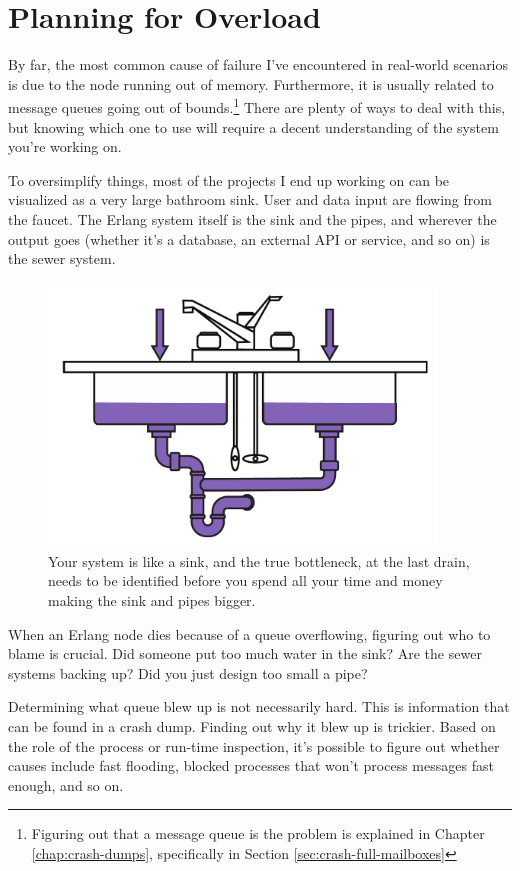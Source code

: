 \documentclass[11pt, oneside]{book}   	%
\begin{document}


\chapter{Planning for Overload}
\label{chap:overload}

By far, the most common cause of failure I've encountered in real-world scenarios is due to the node running out of memory. Furthermore, it is usually related to message queues going out of bounds.\footnote{Figuring out that a message queue is the problem is explained in Chapter \ref{chap:crash-dumps}, specifically in Section \ref{sec:crash-full-mailboxes}} There are plenty of ways to deal with this, but knowing which one to use will require a decent understanding of the system you're working on.

To oversimplify things, most of the projects I end up working on can be visualized as a very large bathroom sink. User and data input are flowing from the faucet. The Erlang system itself is the sink and the pipes, and wherever the output goes (whether it's a database, an external API or service, and so on) is the sewer system.

\begin{figure}
  \includegraphics[max height=7cm]{sink.pdf}%
  \centering%
  \caption{Your system is like a sink, and the true bottleneck, at the last drain, needs to be identified before you spend all your time and money making the sink and pipes bigger.}%
   \label{fig:tracing-venn}
\end{figure}

When an Erlang node dies because of a queue overflowing, figuring out who to blame is crucial. Did someone put too much water in the sink? Are the sewer systems backing up? Did you just design too small a pipe?

Determining what queue blew up is not necessarily hard. This is information that can be found in a crash dump. Finding out why it blew up is trickier. Based on the role of the process or run-time inspection, it's possible to figure out whether causes include fast flooding, blocked processes that won't process messages fast enough, and so on.
\end{document}
